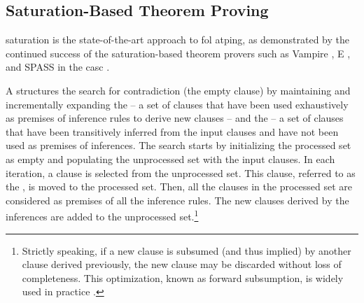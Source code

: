 \subsection{Saturation-Based Theorem Proving}

\Gls{saturation} is the state-of-the-art approach to \gls{fol} \gls{atping},
as demonstrated by the continued success of the saturation-based theorem provers such as Vampire \cite{DBLP:conf/cav/KovacsV13}, E \cite{DBLP:conf/cade/0001CV19}, and SPASS \cite{DBLP:conf/cade/WeidenbachDFKSW09} in the \gls{casc} \cite{Sut16}.

A  structures the search for contradiction
(the empty clause)
by maintaining and incrementally expanding the 
-- a set of clauses that have been used exhaustively as premises of inference rules to derive new clauses -- and the  -- a set of clauses that have been transitively inferred from the input clauses and have not been used as premises of inferences.
The search starts by initializing the processed set as empty and populating the unprocessed set with the input clauses.
In each iteration,
a clause is selected from the unprocessed set.
This clause, referred to as the , is moved to the processed set.
Then, all the clauses in the processed set are considered as premises of all the inference rules.
The new clauses derived by the inferences are added to the unprocessed set.\footnote{Strictly speaking, if a new clause is subsumed (and thus implied) by another clause derived previously, the new clause may be discarded without loss of completeness. This optimization, known as forward subsumption, is widely used in practice \cite{DBLP:journals/corr/cs-SC-0310056,DBLP:journals/jar/Voronkov95,DBLP:books/daglib/0022394}.}


